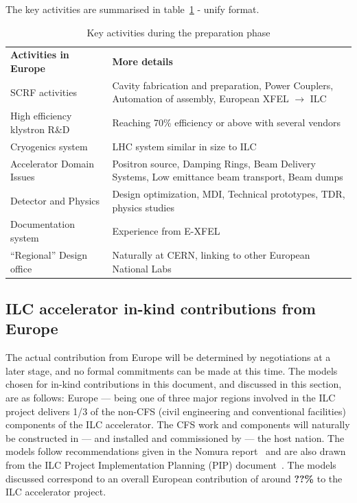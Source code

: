 \documentclass[%
 reprint,
 amsmath,amssymb,
 aps,
]{revtex4-1}
\begin{document}
The key activities are summarised in table~\ref{fig:prep-phase-summary} - unify format.




\begin{table}[htbp]
\begin{ruledtabular}
\begin{tabular}{p{3.5cm}p{4.75cm}}
 \bfseries {Activities in Europe} &\bfseries{More details}                                                         \\
SCRF activities			&Cavity fabrication and preparation, Power Couplers, Automation of assembly, European XFEL $\rightarrow$ ILC\\
High efficiency klystron R\&D   &Reaching 70\% efficiency or above with several vendors   \\
Cryogenics system               &LHC system similar in size to ILC\\
Accelerator Domain Issues       &Positron source, Damping Rings, Beam Delivery Systems, Low emittance beam transport, Beam dumps\\
Detector and Physics            &Design optimization, MDI, Technical prototypes, TDR, physics studies\\
Documentation system            &Experience from E-XFEL                                       \\
“Regional” Design office        &Naturally at CERN, linking to other European National Labs \\
\end{tabular}
\end{ruledtabular}
\caption{\label{fig:prep-phase-summary} Key activities during the preparation phase}
\end{table}


\subsection{ILC accelerator in-kind contributions from Europe ~\label{sec:constrphase:accelerator}}

The actual contribution from Europe will be determined by negotiations at a 
later stage, and no formal commitments can be made at this time. The models 
chosen for in-kind contributions in this document, and discussed in this 
section, are as follows: Europe — being one of three major regions involved in 
the ILC project delivers 1/3 of the non-CFS (civil engineering and conventional facilities) 
components of the ILC accelerator. The CFS work 
and components will naturally be constructed in — and installed and 
commissioned by — the host nation. The models follow recommendations given in 
the Nomura report~\cite{Nomura-eng} and are also drawn from the ILC Project Implementation 
Planning (PIP) document~\cite{ILCPIP}. The models discussed correspond to an overall 
European contribution of around {\bfseries ??\%} to the ILC accelerator project. 
\end{document}
